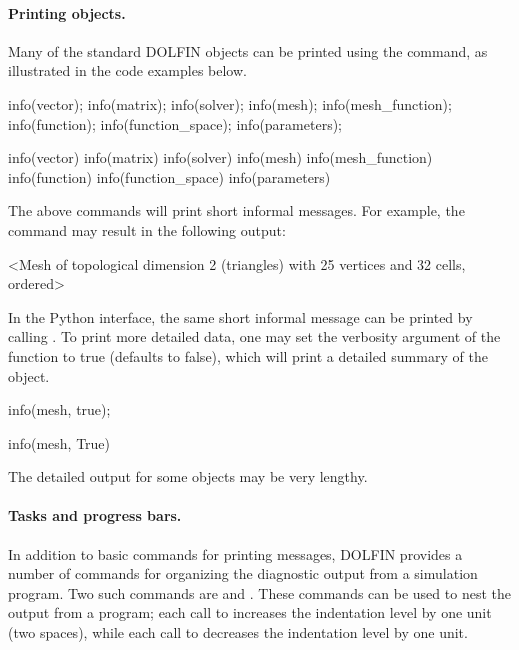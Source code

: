 \paragraph{Printing objects.}

Many of the standard DOLFIN objects can be printed using the 
command, as illustrated in the code examples below.
\begin{c++}
info(vector);
info(matrix);
info(solver);
info(mesh);
info(mesh_function);
info(function);
info(function_space);
info(parameters);
\end{c++}
\begin{python}
info(vector)
info(matrix)
info(solver)
info(mesh)
info(mesh_function)
info(function)
info(function_space)
info(parameters)
\end{python}
The above commands will print short informal messages. For example,
the command  may result in the following output:
\begin{gencode}
<Mesh of topological dimension 2 (triangles) with 25 vertices and 32 cells, ordered>
\end{gencode}
In the Python interface, the same short informal message can be printed
by calling . To print more detailed data, one may
set the verbosity argument of the  function to true (defaults
to false), which will print a detailed summary of the object.
\begin{c++}
info(mesh, true);
\end{c++}
\begin{python}
info(mesh, True)
\end{python}
The detailed output for some objects may be very lengthy.

\paragraph{Tasks and progress bars.}

In addition to basic commands for printing messages, DOLFIN provides a
number of commands for organizing the diagnostic output from a simulation
program. Two such commands are  and . These commands
can be used to nest the output from a program; each call to 
increases the indentation level by one unit (two spaces), while each
call to  decreases the indentation level by one unit.

